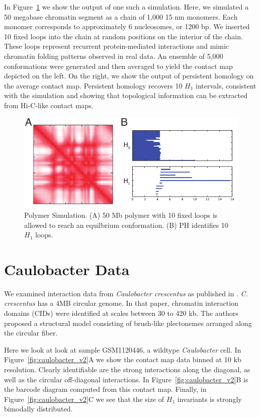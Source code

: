 In Figure~\ref{fig:polymer_sim} we show the output of one such a simulation.
Here, we simulated a 50 megabase chromatin segment as a chain of 1,000 15 nm monomers.
Each monomer corresponds to approximately 6 nucleosomes, or 1200 bp.
We inserted 10 fixed loops into the chain at random positions on the interior of the chain.
These loops represent recurrent protein-mediated interactions and mimic chromatin folding patterns observed in real data.
An ensemble of 5,000 conformations were generated and then averaged to yield the contact map depicted on the left.
On the right, we show the output of persistent homology on the average contact map.
Persistent homology recovers 10 $H_1$ intervals, consistent with the simulation and showing that topological information can be extracted from Hi-C-like contact maps.

\begin{figure}
       \centering
       \includegraphics[width=\columnwidth]{./fig/hic/polymer_sim.pdf}
       \caption[Polymer Simulations of Chromatin Folding]{Polymer Simulation. (A) 50 Mb polymer with 10 fixed loops is allowed to reach an equilbrium conformation. (B) PH identifies 10 $H_1$ loops.}
       \label{fig:polymer_sim}
\end{figure}

\section{Caulobacter Data}
\label{sec:caulobacter_data}
%
We examined interaction data from \emph{Caulobacter crescentus} as published in \cite{Le:2013ci}.
\emph{C. crescentus} has a 4MB circular genome.
In that paper, chromatin interaction domains (CIDs) were identified at scales between 30 to 420 kb.
The authors proposed a structural model consisting of brush-like plectonemes arranged along the circular fiber.

Here we look at look at sample GSM1120446, a wildtype \emph{Caulobacter} cell.
In Figure~\ref{fig:caulobacter_v2}A we show the contact map data binned at 10 kb resolution.
Clearly identifiable are the strong interactions along the diagonal, as well as the circular off-diagonal interactions.
In Figure~\ref{fig:caulobacter_v2}B is the barcode diagram computed from this contact map.
Finally, in Figure~\ref{fig:caulobacter_v2}C we see that the size of $H_1$ invariants is strongly bimodally distributed.

